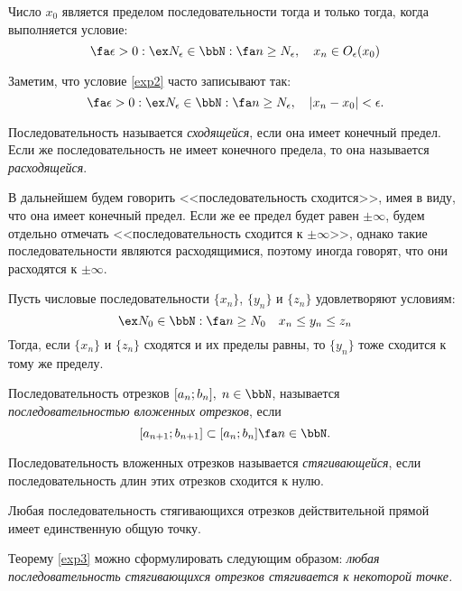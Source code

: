 \begin{lemm}
Число $x_0$ является пределом последовательности тогда и только тогда, когда выполняется условие:
\begin{equation}
\label{exp2}
\fa \epsilon>0: \ex N_\epsilon \in \bbN: \fa n \ge N_\epsilon,\quad x_n \in O_\epsilon(x_0)
\end{equation}
\end{lemm}
Заметим, что условие \eqref{exp2} часто записывают так:
$$
\fa \epsilon>0: \ex N_\epsilon \in \bbN: \fa n \ge N_\epsilon,\quad |x_n-x_0|<\epsilon.
$$
\begin{defn}
Последовательность называется \textit{сходящейся}, если она имеет конечный предел. Если же последовательность не имеет конечного предела, то она называется \textit{расходящейся}.
\end{defn}
В дальнейшем будем говорить <<последовательность сходится>>, имея в виду, что она имеет конечный предел. Если же ее предел будет равен $\pm\infty$, будем отдельно отмечать <<последовательность сходится к $\pm\infty$>>, однако такие последовательности являются расходящимися, поэтому иногда говорят, что они расходятся к $\pm\infty$. 
\begin{thm} \label{exp10}  
Пусть числовые последовательности $\{x_n\}$, $\{y_n\}$ и $\{z_n\}$ удовлетворяют условиям:
$$
\ex N_0 \in \bbN:\fa n\ge N_0 \quad x_n \le y_n \le z_n 
$$
Тогда, если $\{x_n\}$ и $\{z_n\}$ сходятся и их пределы равны, то $\{y_n\}$ тоже сходится к тому же пределу.
\end{thm}

\begin{defn}
Последовательность отрезков $[a_n;b_n],\; n \in \bbN$, называется \textit{последовательностью вложенных отрезков}, если
$$
	[a_{n+1};b_{n+1}]\subset [a_n;b_n] \fa n \in \bbN.
$$
\end{defn}

\begin{defn}
Последовательность вложенных отрезков называется \textit{стягивающейся}, если последовательность длин этих отрезков сходится к нулю.
\end{defn}

\begin{thm}
\label{exp3}
Любая последовательность стягивающихся отрезков действительной прямой имеет единственную общую точку.
\end{thm}

Теорему \ref{exp3} можно сформулировать следующим образом: \textit{любая последовательность стягивающихся отрезков стягивается к некоторой точке.}

